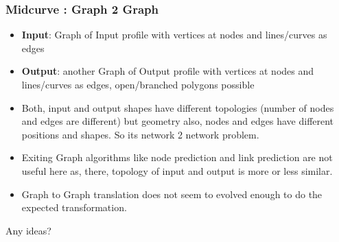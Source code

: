 \begin{frame}[fragile]\frametitle{Midcurve : Graph 2 Graph}

	\begin{itemize}
	\item {\bf Input}: Graph of Input profile with vertices at nodes and lines/curves as edges
	\item {\bf Output}: another Graph of Output profile with vertices at nodes and lines/curves as edges, open/branched polygons possible
	\item Both, input and output shapes have different topologies (number of nodes and edges are different) but geometry also, nodes and edges have different positions and shapes. So its network 2 network problem.
	\item Exiting Graph algorithms like node prediction and link prediction are not useful here as, there, topology of input and output is more or less similar.
	\item Graph to Graph translation does not seem to evolved enough to do the expected transformation.
	\end{itemize}
	
Any ideas?

\end{frame}






